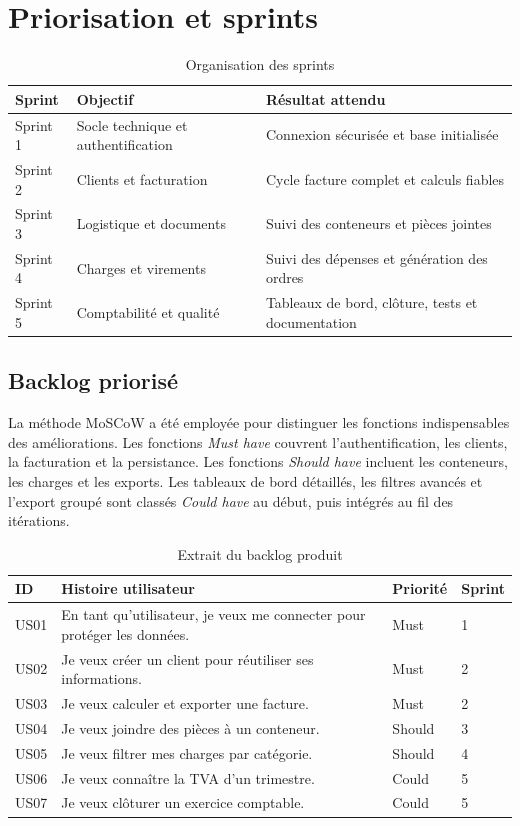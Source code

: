 \documentclass[12pt,a4paper,oneside]{report}
\begin{document}
\section{Priorisation et sprints}
\begin{table}[H]\centering
\caption{Organisation des sprints}
\begin{tabularx}{\textwidth}{p{2cm}Y Y}
\toprule \textbf{Sprint} & \textbf{Objectif} & \textbf{Résultat attendu}\\ \midrule
Sprint 1 & Socle technique et authentification & Connexion sécurisée et base initialisée\\
Sprint 2 & Clients et facturation & Cycle facture complet et calculs fiables\\
Sprint 3 & Logistique et documents & Suivi des conteneurs et pièces jointes\\
Sprint 4 & Charges et virements & Suivi des dépenses et génération des ordres\\
Sprint 5 & Comptabilité et qualité & Tableaux de bord, clôture, tests et documentation\\
\bottomrule
\end{tabularx}
\end{table}

\subsection{Backlog priorisé}
La méthode MoSCoW a été employée pour distinguer les fonctions indispensables des améliorations. Les fonctions \emph{Must have} couvrent l'authentification, les clients, la facturation et la persistance. Les fonctions \emph{Should have} incluent les conteneurs, les charges et les exports. Les tableaux de bord détaillés, les filtres avancés et l'export groupé sont classés \emph{Could have} au début, puis intégrés au fil des itérations.

\begin{table}[H]\centering
\caption{Extrait du backlog produit}
\begin{tabularx}{\textwidth}{p{1.5cm}Y p{2.5cm}p{2cm}}
\toprule \textbf{ID} & \textbf{Histoire utilisateur} & \textbf{Priorité} & \textbf{Sprint}\\ \midrule
US01 & En tant qu'utilisateur, je veux me connecter pour protéger les données. & Must & 1\\
US02 & Je veux créer un client pour réutiliser ses informations. & Must & 2\\
US03 & Je veux calculer et exporter une facture. & Must & 2\\
US04 & Je veux joindre des pièces à un conteneur. & Should & 3\\
US05 & Je veux filtrer mes charges par catégorie. & Should & 4\\
US06 & Je veux connaître la TVA d'un trimestre. & Could & 5\\
US07 & Je veux clôturer un exercice comptable. & Could & 5\\
\bottomrule
\end{tabularx}
\end{table}
\end{document}
